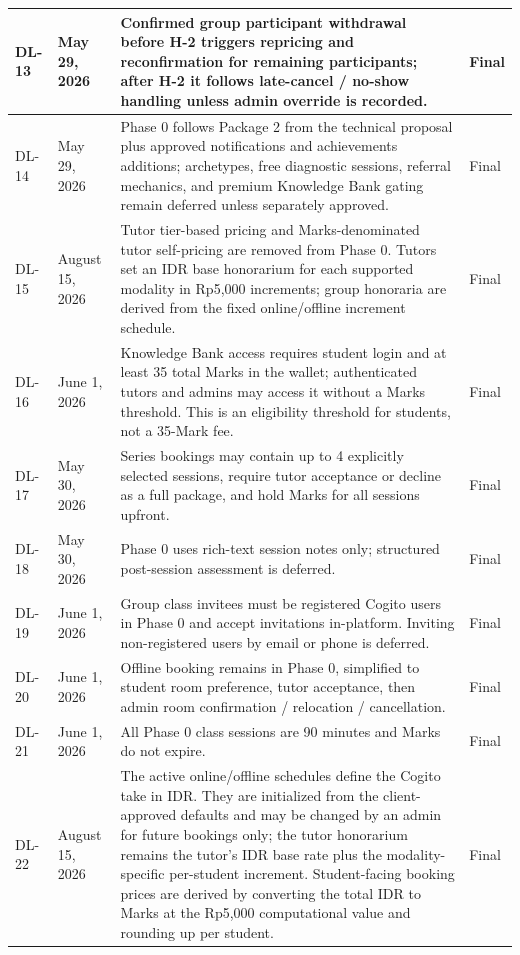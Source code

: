\documentclass[11pt,a4paper]{article}
\begin{document}
\begin{longtable}{|L{1.6cm}|L{2.1cm}|L{8.6cm}|L{2.1cm}|}
DL-13 & May 29, 2026 & Confirmed group participant withdrawal before H-2 triggers repricing and reconfirmation for remaining participants; after H-2 it follows late-cancel / no-show handling unless admin override is recorded. & Final \\
\hline
DL-14 & May 29, 2026 & Phase 0 follows Package 2 from the technical proposal plus approved notifications and achievements additions; archetypes, free diagnostic sessions, referral mechanics, and premium Knowledge Bank gating remain deferred unless separately approved. & Final \\
\hline
DL-15 & August 15, 2026 & Tutor tier-based pricing and Marks-denominated tutor self-pricing are removed from Phase 0. Tutors set an IDR base honorarium for each supported modality in Rp5,000 increments; group honoraria are derived from the fixed online/offline increment schedule. & Final \\
\hline
DL-16 & June 1, 2026 & Knowledge Bank access requires student login and at least 35 total Marks in the wallet; authenticated tutors and admins may access it without a Marks threshold. This is an eligibility threshold for students, not a 35-Mark fee. & Final \\
\hline
DL-17 & May 30, 2026 & Series bookings may contain up to 4 explicitly selected sessions, require tutor acceptance or decline as a full package, and hold Marks for all sessions upfront. & Final \\
\hline
DL-18 & May 30, 2026 & Phase 0 uses rich-text session notes only; structured post-session assessment is deferred. & Final \\
\hline
DL-19 & June 1, 2026 & Group class invitees must be registered Cogito users in Phase 0 and accept invitations in-platform. Inviting non-registered users by email or phone is deferred. & Final \\
\hline
DL-20 & June 1, 2026 & Offline booking remains in Phase 0, simplified to student room preference, tutor acceptance, then admin room confirmation / relocation / cancellation. & Final \\
\hline
DL-21 & June 1, 2026 & All Phase 0 class sessions are 90 minutes and Marks do not expire. & Final \\
\hline
DL-22 & August 15, 2026 & The active online/offline schedules define the Cogito take in IDR. They are initialized from the client-approved defaults and may be changed by an admin for future bookings only; the tutor honorarium remains the tutor's IDR base rate plus the modality-specific per-student increment. Student-facing booking prices are derived by converting the total IDR to Marks at the Rp5,000 computational value and rounding up per student. & Final \\

\end{longtable}
\end{document}
